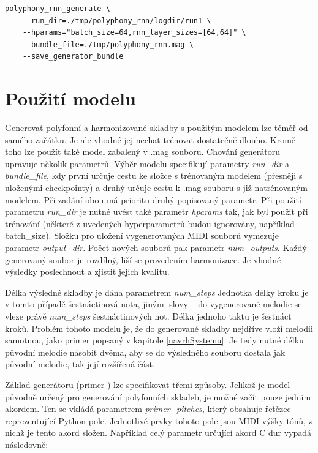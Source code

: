 \begin{verbatim}
polyphony_rnn_generate \
    --run_dir=./tmp/polyphony_rnn/logdir/run1 \
    --hparams="batch_size=64,rnn_layer_sizes=[64,64]" \
    --bundle_file=./tmp/polyphony_rnn.mag \
    --save_generator_bundle
\end{verbatim}

\section{Použití modelu}
Generovat polyfonní a harmonizované skladby s použitým modelem
lze téměř od samého začátku.
Je ale vhodné jej nechat trénovat dostatečně dlouho.
Kromě toho lze použít také model zabalený v .mag souboru.
Chování generátoru upravuje několik parametrů.
Výběr modelu specifikují parametry \emph{run\_dir} a \emph{bundle\_file},
kdy první určuje cestu ke složce s trénovaným modelem (přesněji s uloženými checkpointy)
a druhý určuje cestu k .mag souboru s již natrénovaným modelem.
Při zadání obou má prioritu druhý popisovaný parametr.
Při použití parametru \emph{run\_dir} je nutné uvést
také parametr \emph{hparams} tak, jak byl použit při trénování 
(některé z uvedených hyperparametrů budou ignorovány, například batch\_size).
Složku pro uložení vygenerovaných MIDI souborů vymezuje parametr \emph{output\_dir}.
Počet nových souborů pak parametr \emph{num\_outputs}.
Každý generovaný soubor je rozdílný, liší se provedením harmonizace.
Je vhodné výsledky poslechnout a zjistit jejich kvalitu.
\par

Délka výsledné skladby je dána parametrem \emph{num\_steps} 
Jednotka délky kroku je v tomto případě šestnáctinová nota,
jinými slovy -- do vygenerované melodie se vleze právě \emph{num\_steps} šestnáctinových not.
Délka jednoho taktu je šestnáct kroků.
Problém tohoto modelu je, že do generované skladby nejdříve vloží melodii samotnou, 
jako primer popsaný v kapitole \ref{navrhSystemu}.
Je tedy nutné délku původní melodie násobit dvěma,
aby se do výsledného souboru dostala jak původní melodie,
tak její rozšířená část.
\cite{google_git_polyphony}

\par

Základ generátoru (primer ) lze specifikovat třemi způsoby.
Jelikož je model původně určený pro generování polyfonních skladeb,
je možné začít pouze jedním akordem.
Ten se vkládá parametrem \emph{primer\_pitches},
který obsahuje řetězec reprezentující Python pole.
Jednotlivé prvky tohoto pole jsou MIDI výšky tónů,
z nichž je tento akord složen.
Například celý parametr určující akord C dur vypadá následovně:

